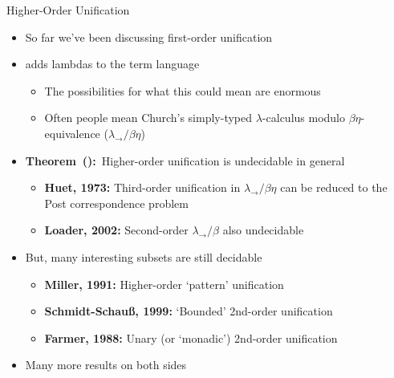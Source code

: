 \documentclass[pdf,fyma2]{prosper} %
\makeatletter
\newcommand{\thm}[1][]{%
    \def\thm@tmp{#1}%
    {\color{wine}%
    \textbf{Theorem\ifx\thm@tmp\@empty\relax\else\ (\thm@tmp)\fi:}\ }}
\makeatother
\begin{document}
\begin{slide}{Higher-Order Unification}
	\begin{itemize}
	\item So far we've been discussing first-order unification
	\item {} adds lambdas to the term language
    	\begin{itemize}
    	\item The possibilities for what this could mean are enormous
    	\item Often people mean Church's simply-typed $\lambda$-calculus modulo $\beta\eta$-equivalence ($\lambda_{\rightarrow}/\beta\eta$)
    	\end{itemize}
	\vspace{1em}
	\item \thm Higher-order unification is undecidable in general
    	\begin{itemize}
    	\item \textbf{Huet, 1973:} Third-order unification in $\lambda_{\rightarrow}/\beta\eta$ can be reduced to the Post correspondence problem
    	\item \textbf{Loader, 2002:} Second-order $\lambda_{\rightarrow}/\beta$ also undecidable
    	\end{itemize}
    \item But, many interesting subsets are still decidable
    	\begin{itemize}
    	\item \textbf{Miller, 1991:} Higher-order `pattern' unification
    	\item \textbf{Schmidt-Schau\ss, 1999:} `Bounded' 2nd-order unification
    	\item \textbf{Farmer, 1988:} Unary (or `monadic') 2nd-order unification
    	\end{itemize}
    \item Many more results on both sides
    \end{itemize}
\end{slide}
\end{document}
